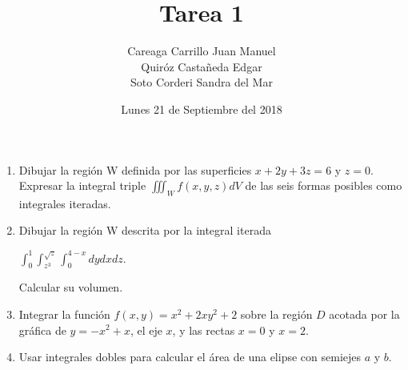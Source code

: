 \documentclass{article}
\begin{document}
\title{Tarea 1}
        \author{Careaga Carrillo Juan Manuel \\ Quiróz Castañeda Edgar \\ Soto Corderi Sandra del Mar}
        \date{Lunes 21 de Septiembre del 2018}
        \maketitle

	\begin{enumerate}
   	\item {
   Dibujar la región W definida por las superficies $x + 2y + 3z = 6$ y $z = 0$. Expresar la integral triple $\iiint_Wf(x,y,z)dV$ de las seis formas posibles como integrales iteradas.\\

	}

   \item {
    Dibujar la región W descrita por la integral iterada
    \begin{center}
    $\int_{0}^{1}\int_{z^3}^{\sqrt{z}}\int_{0}^{4-x}dydxdz$. 
    \end{center}
    Calcular su volumen.\\
		     
	}


   \item {
    Integrar la función $f(x,y) = x^2 + 2xy^2 + 2$ sobre la región $D$ acotada por la gráfica de $y = -x^2 + x$, el eje $x$, y las rectas $x = 0$ y $x = 2$.\\


	}

    \item {
        Usar integrales dobles para calcular el área de una elipse con semiejes $a$ y $b$.

}
\end{enumerate}
\end{document}
